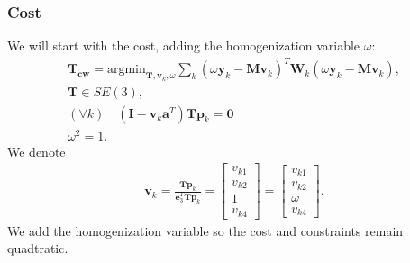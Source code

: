 \documentclass{article}
\begin{document}
\subsubsection{Cost}

We will start with the cost, adding the homogenization variable $\omega$:
\begin{align}
\mathbf{T_{cw}} = \text{argmin}_{\mathbf{T}, \mathbf{v}_k, \omega} \sum_k (\omega \mathbf{y}_k - \mathbf{M} \mathbf{v}_k)^T \mathbf{W}_k (\omega \mathbf{y}_k - \mathbf{M} \mathbf{v}_k),\\
\mathbf{T} \in SE(3),\\
(\forall k) \quad (\mathbf{I} - \mathbf{v}_k \mathbf{a}^T)\mathbf{T}\mathbf{p}_k = \mathbf{0}\\
\omega^2 = 1.
\end{align}
We denote
\begin{align}
    \mathbf{v}_k = \frac{\mathbf{T}\mathbf{p}_k}{\mathbf{e}_3^T \mathbf{T} \mathbf{p}_k} = \begin{bmatrix}
        v_{k1} \\
        v_{k2} \\
        1 \\
        v_{k4}
    \end{bmatrix} = \begin{bmatrix}
        v_{k1} \\
        v_{k2} \\
        \omega \\
        v_{k4}
    \end{bmatrix}.
\end{align}
We add the homogenization variable so the cost and constraints remain quadtratic.
\end{document}
